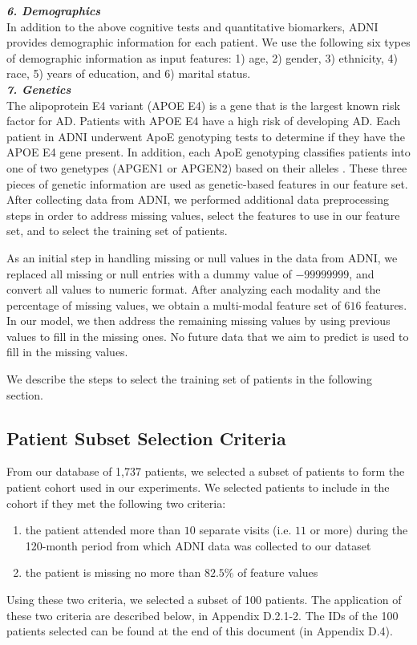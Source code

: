 \documentclass{article}
\begin{document}
\textbf{\textit{6. Demographics}}\\
In addition to the above cognitive tests and quantitative biomarkers, ADNI provides demographic information for each patient. We use the following six types of demographic information as input features: 1) age, 2) gender, 3) ethnicity, 4) race, 5) years of education, and 6) marital status. \\

\textbf{\textit{7. Genetics}}\\
The alipoprotein E4 variant (APOE E4) is a gene that is the largest known risk factor for AD. Patients with APOE E4 have a high risk of developing AD. Each patient in ADNI underwent ApoE genotyping tests to determine if they have the APOE E4 gene present. In addition, each ApoE genotyping classifies patients into one of two genetypes (APGEN1 or APGEN2) based on their alleles \cite{tadpole2017}. These three pieces of genetic information are used as genetic-based features in our feature set.\\

After collecting data from ADNI, we performed additional data preprocessing steps in order to address missing values, select the features to use in our feature set, and to select the training set of patients.

As an initial step in handling missing or null values in the data from ADNI, we replaced all missing or null entries with a dummy value of $-99999999$, and convert all values to numeric format. After analyzing each modality and the percentage of missing values, we obtain a multi-modal feature set of $616$ features. In our model, we then address the remaining missing values by using previous values to fill in the missing ones. No future data that we aim to predict is used to fill in the missing values. 

We describe the steps to select the training set of patients in the following section. 

\subsection{Patient Subset Selection Criteria}
From our database of 1,737 patients, we selected a subset of patients to form the patient cohort used in our experiments. We selected patients to include in the cohort if they met the following two criteria: 
\begin{enumerate}
  \item  the patient attended more than $10$ separate visits (i.e. $11$ or more) during the 120-month period from which ADNI data was collected to our dataset
  \item  the patient is missing no more than $82.5\%$ of feature values
\end{enumerate}
Using these two criteria, we selected a subset of 100 patients. The application of these two criteria are described below, in Appendix D.2.1-2. The IDs of the 100 patients selected can be found at the end of this document (in Appendix D.4).
\end{document}
